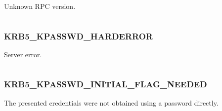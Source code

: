 \documentclass[letterpaper,10pt,english]{sphinxmanual}
\begin{document}
Unknown RPC version.

\begin{tabulary}{\linewidth}{|L|L|}
\hline

 & 
\\
\hline\end{tabulary}



\subsubsection{KRB5\_KPASSWD\_HARDERROR}
\label{appdev/refs/macros/KRB5_KPASSWD_HARDERROR:krb5-kpasswd-harderror}\label{appdev/refs/macros/KRB5_KPASSWD_HARDERROR:krb5-kpasswd-harderror-data}\label{appdev/refs/macros/KRB5_KPASSWD_HARDERROR::doc}

\begin{fulllineitems}
\label{appdev/refs/macros/KRB5_KPASSWD_HARDERROR:KRB5_KPASSWD_HARDERROR}
\end{fulllineitems}


Server error.

\begin{tabulary}{\linewidth}{|L|L|}
\hline

 & 
\\
\hline\end{tabulary}



\subsubsection{KRB5\_KPASSWD\_INITIAL\_FLAG\_NEEDED}
\label{appdev/refs/macros/KRB5_KPASSWD_INITIAL_FLAG_NEEDED:krb5-kpasswd-initial-flag-needed}\label{appdev/refs/macros/KRB5_KPASSWD_INITIAL_FLAG_NEEDED::doc}\label{appdev/refs/macros/KRB5_KPASSWD_INITIAL_FLAG_NEEDED:krb5-kpasswd-initial-flag-needed-data}

\begin{fulllineitems}
\label{appdev/refs/macros/KRB5_KPASSWD_INITIAL_FLAG_NEEDED:KRB5_KPASSWD_INITIAL_FLAG_NEEDED}
\end{fulllineitems}


The presented credentials were not obtained using a password directly.
\end{document}
